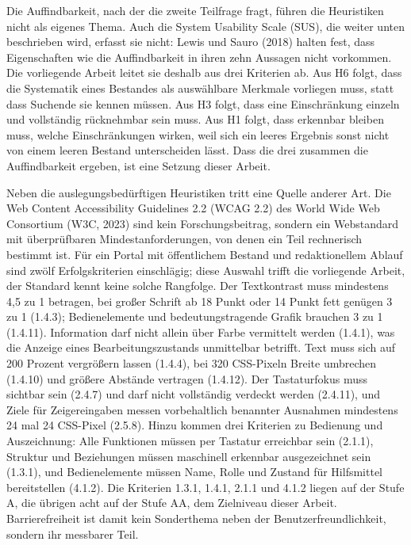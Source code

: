 Die Auffindbarkeit, nach der die zweite Teilfrage fragt, führen die Heuristiken nicht als eigenes Thema. Auch die System Usability Scale (SUS), die weiter unten beschrieben wird, erfasst sie nicht: Lewis und Sauro (2018) halten fest, dass Eigenschaften wie die Auffindbarkeit in ihren zehn Aussagen nicht vorkommen. Die vorliegende Arbeit leitet sie deshalb aus drei Kriterien ab. Aus H6 folgt, dass die Systematik eines Bestandes als auswählbare Merkmale vorliegen muss, statt dass Suchende sie kennen müssen. Aus H3 folgt, dass eine Einschränkung einzeln und vollständig rücknehmbar sein muss. Aus H1 folgt, dass erkennbar bleiben muss, welche Einschränkungen wirken, weil sich ein leeres Ergebnis sonst nicht von einem leeren Bestand unterscheiden lässt. Dass die drei zusammen die Auffindbarkeit ergeben, ist eine Setzung dieser Arbeit.

Neben die auslegungsbedürftigen Heuristiken tritt eine Quelle anderer Art. Die Web Content Accessibility Guidelines 2.2 (WCAG 2.2) des World Wide Web Consortium (W3C, 2023) sind kein Forschungsbeitrag, sondern ein Webstandard mit überprüfbaren Mindestanforderungen, von denen ein Teil rechnerisch bestimmt ist. Für ein Portal mit öffentlichem Bestand und redaktionellem Ablauf sind zwölf Erfolgskriterien einschlägig; diese Auswahl trifft die vorliegende Arbeit, der Standard kennt keine solche Rangfolge. Der Textkontrast muss mindestens 4,5 zu 1 betragen, bei großer Schrift ab 18 Punkt oder 14 Punkt fett genügen 3 zu 1 (1.4.3); Bedienelemente und bedeutungstragende Grafik brauchen 3 zu 1 (1.4.11). Information darf nicht allein über Farbe vermittelt werden (1.4.1), was die Anzeige eines Bearbeitungszustands unmittelbar betrifft. Text muss sich auf 200 Prozent vergrößern lassen (1.4.4), bei 320 CSS-Pixeln Breite umbrechen (1.4.10) und größere Abstände vertragen (1.4.12). Der Tastaturfokus muss sichtbar sein (2.4.7) und darf nicht vollständig verdeckt werden (2.4.11), und Ziele für Zeigereingaben messen vorbehaltlich benannter Ausnahmen mindestens 24 mal 24 CSS-Pixel (2.5.8). Hinzu kommen drei Kriterien zu Bedienung und Auszeichnung: Alle Funktionen müssen per Tastatur erreichbar sein (2.1.1), Struktur und Beziehungen müssen maschinell erkennbar ausgezeichnet sein (1.3.1), und Bedienelemente müssen Name, Rolle und Zustand für Hilfsmittel bereitstellen (4.1.2). Die Kriterien 1.3.1, 1.4.1, 2.1.1 und 4.1.2 liegen auf der Stufe A, die übrigen acht auf der Stufe AA, dem Zielniveau dieser Arbeit. Barrierefreiheit ist damit kein Sonderthema neben der Benutzerfreundlichkeit, sondern ihr messbarer Teil.

